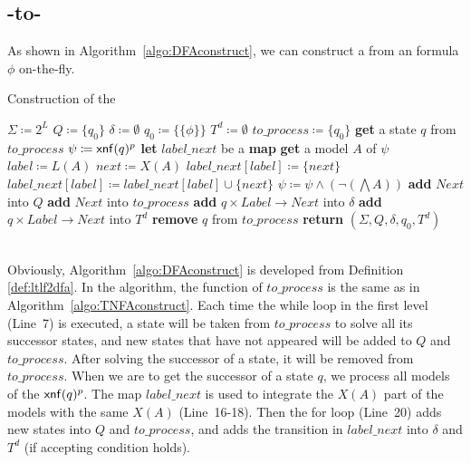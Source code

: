 \subsection{\ltlf-to-\TDFA}
As shown in Algorithm~\ref{algo:DFAconstruct}, we can construct a \TDFA from an \ltlf formula $\phi$ on-the-fly.

\begin{algorithm}[H]\label{algo:DFAconstruct}
  \caption{Construction of the \TDFA}
  \LinesNumbered
  $\Sigma\coloneqq 2^L$\;
  $Q\coloneqq\{q_0\}$\;
  $\delta\coloneqq\emptyset$\;
  $q_0\coloneqq\{\{\phi\}\}$\;
  $T^d\coloneqq\emptyset$\;
  $to\_process\coloneqq\{q_0\}$\;
  {
    \textbf{get} a state $q$ from $to\_process$\;
    $\psi\coloneqq{\sf xnf}(q)^p$\;
    \textbf{let}  $label\_next$ be a \textbf{map}\;
    {
      \textbf{get} a model $A$ of $\psi$\;
      $label\coloneqq L(A)$\;
      $next\coloneqq X(A)$\;
      {
        $label\_next[label]\coloneqq \{next\}$\;
      }
      \Else
      {
        $label\_next[label]\coloneqq label\_next[label]\cup\{next\}$\;
      }
      $\psi\coloneqq \psi\land(\neg(\bigwedge A))$\;
    }
    {
      {
        \textbf{add} $Next$ into $Q$\;
        \textbf{add} $Next$ into $to\_process$\;
      }
      \textbf{add} $q\times Label\to Next$ into $\delta$\;
      {
        \textbf{add} $q\times Label\to Next$ into $T^d$\;
      }
    }
    \textbf{remove} $q$ from $to\_process$\;
  }
  \textbf{return} $(\Sigma,Q,\delta,q_0,T^d)$\;
\end{algorithm}
~\\
Obviously, Algorithm~\ref{algo:DFAconstruct} is developed from Definition \ref{def:ltlf2dfa}. In the algorithm, the function of $to\_process$ is the same as in Algorithm~\ref{algo:TNFAconstruct}. Each time the while loop in the first level (Line~7) is executed, a state will be taken from $to\_process$ to solve all its successor states, and new states that have not appeared will be added to $Q$ and $to\_process$. After solving the successor of a state, it will be removed from $to\_process$. When we are to get the successor of a state $q$, we process all models of the ${\sf xnf}(q)^p$. The map $label\_next$ is used to integrate the $X(A)$ part of the models with the same $X(A)$ (Line~16-18). Then the for loop (Line~20) adds new states into $Q$ and $to\_process$, and adds the transition in $label\_next$ into $\delta$ and $T^d$ (if accepting condition holds).

